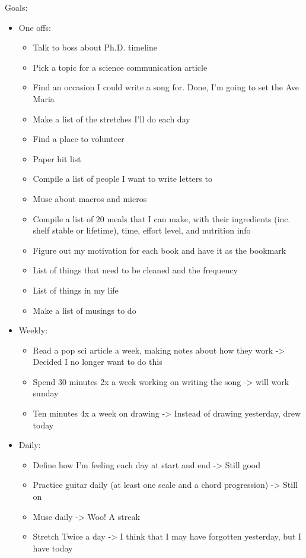 \documentclass[12pt]{article}[titlepage]
\renewcommand{\,}{\textsuperscript{,}}
\begin{document}
Goals:
\begin{itemize}
\item One offs:
\begin{itemize}
\item Talk to boss about Ph.D. timeline
\item Pick a topic for a science communication article
\item Find an occasion I could write a song for. Done, I'm going to set the Ave Maria
\item Make a list of the stretches I'll do each day
\item Find a place to volunteer
\item Paper hit list
\item Compile a list of people I want to write letters to
\item Muse about macros and micros
\item Compile a list of 20 meals that I can make, with their ingredients (inc. shelf stable or lifetime), time, effort level, and nutrition info
\item Figure out my motivation for each book and have it as the bookmark
\item List of things that need to be cleaned and the frequency
\item List of things in my life
\item Make a list of musings to do
\end{itemize}
\item Weekly:
\begin{itemize}
\item Read a pop sci article a week, making notes about how they work -> Decided I no longer want to do this
\item Spend 30 minutes 2x a week working on writing the song -> will work sunday
\item Ten minutes 4x a week on drawing -> Instead of drawing yesterday, drew today
\end{itemize}
\item Daily:
\begin{itemize}
\item Define how I'm feeling each day at start and end -> Still good
\item Practice guitar daily (at least one scale and a chord progression) -> Still on
\item Muse daily -> Woo! A streak
\item Stretch Twice a day -> I think that I may have forgotten yesterday, but I have today
\end{itemize}
\end{itemize}
\end{document}
